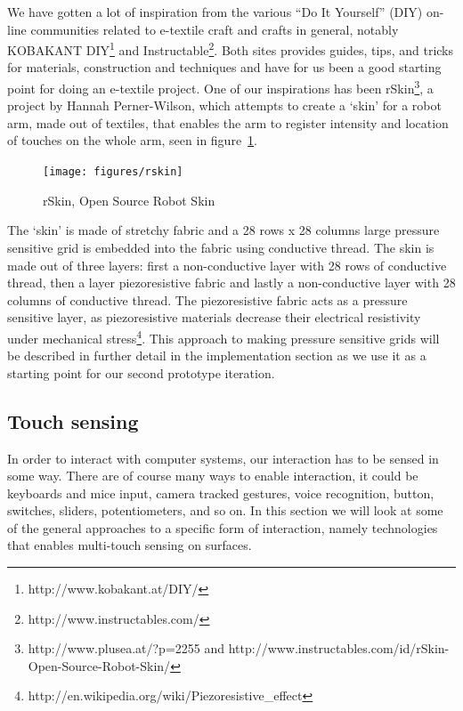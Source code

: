 We have gotten a lot of inspiration from the various ``Do It Yourself'' (DIY) on-line communities related to e-textile craft and crafts in general, notably KOBAKANT DIY\footnote{http://www.kobakant.at/DIY/} and Instructable\footnote{http://www.instructables.com/}.
Both sites provides guides, tips, and tricks for materials, construction and techniques and have for us been a good starting point for doing an e-textile project.
One of our inspirations has been rSkin\footnote{http://www.plusea.at/?p=2255 and http://www.instructables.com/id/rSkin-Open-Source-Robot-Skin/}, a project by Hannah Perner-Wilson, which attempts to create a `skin' for a robot arm, made out of textiles, that enables the arm to register intensity and location of touches on the whole arm, seen in figure~\ref{rskin}.

\begin{figure}[h]
  \centering
  \begin{minipage}[b]{.8\textwidth}
    \centering
    \texttt{[image: figures/rskin]}
  	\caption{rSkin, Open Source Robot Skin}
    \label{rskin}
    \end{minipage}
\end{figure}

The `skin' is made of stretchy fabric and a 28 rows x 28 columns large pressure sensitive grid is embedded into the fabric using conductive thread.
The skin is made out of three layers: first a non-conductive layer with 28 rows of conductive thread, then a layer piezoresistive fabric and lastly a non-conductive layer with 28 columns of conductive thread.
The piezoresistive fabric acts as a pressure sensitive layer, as piezoresistive materials decrease their electrical resistivity under mechanical stress\footnote{http://en.wikipedia.org/wiki/Piezoresistive\_effect}.
This approach to making pressure sensitive grids will be described in further detail in the implementation section as we use it as a starting point for our second prototype iteration.

\subsection{Touch sensing}
\label{ch:textiletouch:related:touch}
In order to interact with computer systems, our interaction has to be sensed in some way.
There are of course many ways to enable interaction, it could be keyboards and mice input, camera tracked gestures, voice recognition, button, switches, sliders, potentiometers, and so on.
In this section we will look at some of the general approaches to a specific form of interaction, namely technologies that enables multi-touch sensing on surfaces.

